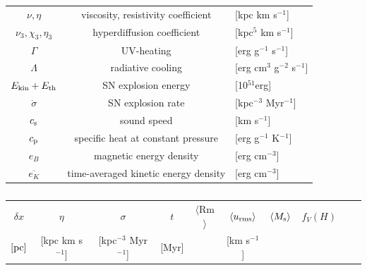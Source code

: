 \documentclass[iop,apj,numberedappendix,twocolappendix]{emulateapj}
\newcommand\ESK{E_{\rm kin}}
\newcommand\EST{E_{\rm th}}
\begin{document}
\begin{table}[h]
\begin{tabular}{ccl}
 $\nu,\eta$ & viscosity, resistivity coefficient& [kpc km s$^{-1}$]\\
 $\nu_3,\chi_3,\eta_3$ & hyperdiffusion coefficient& [kpc$^{5}$ km s$^{-1}$]\\
 $\Gamma$ & UV-heating& [erg g$^{-1}$ s$^{-1}$]\\
 $\Lambda$ & radiative cooling& [erg cm$^{3}$ g$^{-2}$ s$^{-1}$]\\
 $\ESK+\EST$ & SN explosion energy& [10$^{51}$erg]\\
 $\dot\sigma$ & SN explosion rate & [kpc$^{-3}$ Myr$^{-1}$]\\
 $c_{\rm s}$ & sound speed & [km s$^{-1}$]\\
 $c_{\rm p}$ & specific heat at constant pressure & [erg g$^{-1}$ K$^{-1}$]\\
 $e_B$ & magnetic energy density & [erg cm$^{-3}$]\\
 $\overline{e_K}$ & time-averaged kinetic energy density & [erg cm$^{-3}$]\\
\hline
\end{tabular}
\end{table}


\begin{table}
\caption{\label{tab:Rm}}
\begin{tabular}{cccccccccc}
\hline
$\delta x$& $\eta$          & $\sigma$              &$ t$&$\langle$Rm$\rangle$&$\langle u_{\rm rms}\rangle$ &$\langle M_{\rm s}\rangle$ & $f_V(H)$\\
$[\rm pc]$&[kpc km s$^{-1}$]&[kpc$^{-3}$ Myr$^{-1}$]&[Myr]   &   &    [km s$^{-1}$]&  &\\  
\hline

\end{tabular}
\end{table}
\end{document}
